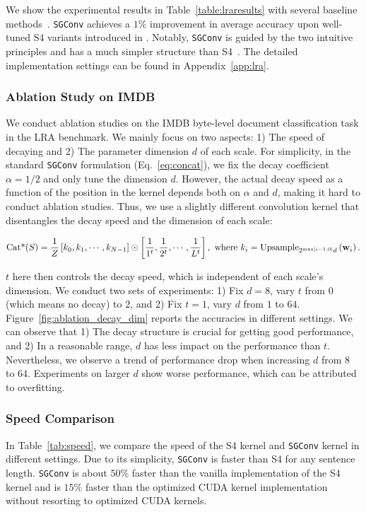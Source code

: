 We show the experimental results in Table~\ref{table:lraresults} with several baseline methods~\citep{vaswani2017attention,child2019generating,wang2020linformer,kitaev2019reformer,zaheer2020big,gu2021efficiently,gu2022train}. \texttt{SGConv} achieves a $1\%$ improvement in average accuracy upon well-tuned S4 variants introduced in \citet{gu2022train}. Notably, \texttt{SGConv} is guided by the two intuitive principles and has a much simpler structure than S4~\citep{gu2022train}. The detailed implementation settings can be found in Appendix~\ref{app:lra}.
\subsubsection{Ablation Study on IMDB}\label{sec:ablation}
We conduct ablation studies on the IMDB byte-level document classification task in the LRA benchmark. We mainly focus on two aspects: 1) The speed of decaying and 2) The parameter dimension $d$ of each scale. For simplicity, in the standard \texttt{SGConv} formulation (Eq.~\eqref{eq:concat}), we fix the decay coefficient $\alpha=1/2$ and only tune the dimension $d$. However, the actual decay speed as a function of the position in the kernel depends both on $\alpha$ and $d$, making it hard to conduct ablation studies. Thus, we use a slightly different convolution kernel that disentangles the decay speed and the dimension of each scale:

\begin{align}\label{eq:concat_ablation}
    \textnormal{Cat*}(S) = \frac{1}{Z}\left[k_0, k_1, \cdots, k_{N-1}\right]\odot\left[\frac{1}{1^t}, \frac{1}{2^t}, \cdots, \frac{1}{L^t}\right], 
\text{ where }k_i = \textnormal{Upsample}_{2^{\max\left[i-1, 0\right]}d}\left(\mathbf{w}_i\right).
\end{align}

$t$ here then controls the decay speed, which is independent of each scale's dimension. We conduct two sets of experiments: 1) Fix $d=8$, vary $t$ from $0$ (which means no decay) to $2$, and 2) Fix $t=1$, vary $d$ from $1$ to $64$. Figure~\ref{fig:ablation_decay_dim} reports the accuracies in different settings. We can observe that 1) The decay structure is crucial for getting good performance, and 2) In a reasonable range, $d$ has less impact on the performance than $t$. Nevertheless, we observe a trend of performance drop when increasing $d$ from $8$ to $64$. Experiments on larger $d$ show worse performance, which can be attributed to overfitting.
\subsubsection{Speed Comparison}\label{sec:speed}
In Table~\ref{tab:speed}, we compare the speed of the S4 kernel and \texttt{SGConv} kernel in different settings. Due to its simplicity, \texttt{SGConv} is faster than S4 for any sentence length. \texttt{SGConv} is about $50\%$ faster than the vanilla implementation of the S4 kernel and is $15\%$ faster than the optimized CUDA kernel implementation without resorting to optimized CUDA kernels. 

